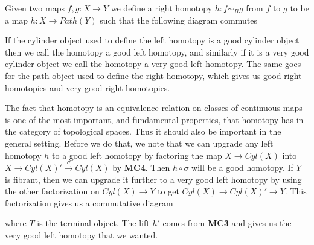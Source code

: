\begin{definition}
Given two maps $f,g: X\rightarrow Y$ we define a right homotopy $h:f\sim_R g$ from $f$ to $g$ to be a map $h: X\rightarrow Path(Y)$ such that the following diagram commutes
\begin{center}
\end{center}
\end{definition}

If the cylinder object used to define the left homotopy is a good cylinder object then we call the homotopy a good left homotopy, and similarly if it is a very good cylinder object we call the homotopy a very good left homotopy. The same goes for the path object used to define the right homotopy, which gives us good right homotopies and very good right homotopies.

The fact that homotopy is an equivalence relation on classes of continuous maps is one of the most important, and fundamental properties, that homotopy has in the category of topological spaces. Thus it should also be important in the general setting. Before we do that, we note that we can upgrade any left homotopy $h$ to a good left homotopy by factoring the map $X\rightarrow Cyl(X)$ into $X\rightarrow Cyl(X)' \overset{\sigma}\rightarrow Cyl(X)$ by \textbf{MC4}. Then $h\circ \sigma$ will be a good homotopy. If $Y$ is fibrant, then we can upgrade it further to a very good left homotopy by using the other factorization on $Cyl(X)\rightarrow Y$ to get $Cyl(X)\rightarrow Cyl(X)'\rightarrow Y$. This factorization gives us a commutative diagram
\begin{center}
\end{center}
where $T$ is the terminal object. The lift $h'$ comes from \textbf{MC3} and gives us the very good left homotopy that we wanted. 

